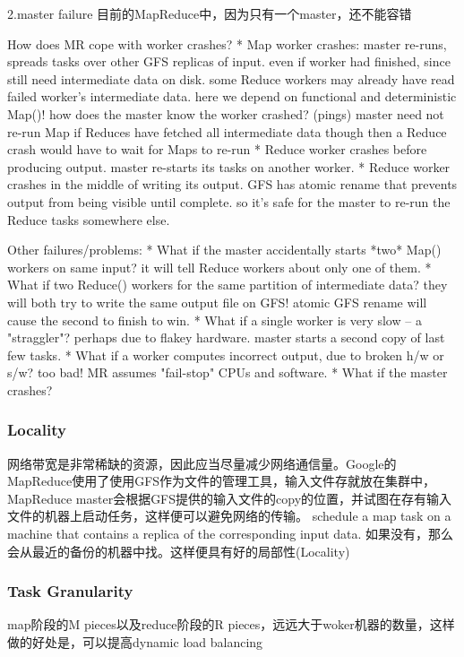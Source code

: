 2.master failure
目前的MapReduce中，因为只有一个master，还不能容错

How does MR cope with worker crashes?
  * Map worker crashes:
    master re-runs, spreads tasks over other GFS replicas of input.
      even if worker had finished, since still need intermediate data on disk.
    some Reduce workers may already have read failed worker's intermediate data.
      here we depend on functional and deterministic Map()!
    how does the master know the worker crashed? (pings)
    master need not re-run Map if Reduces have fetched all intermediate data
      though then a Reduce crash would have to wait for Maps to re-run
  * Reduce worker crashes before producing output.
    master re-starts its tasks on another worker.
  * Reduce worker crashes in the middle of writing its output.
    GFS has atomic rename that prevents output from being visible until complete.
    so it's safe for the master to re-run the Reduce tasks somewhere else.

Other failures/problems:
  * What if the master accidentally starts *two* Map() workers on same input?
    it will tell Reduce workers about only one of them.
  * What if two Reduce() workers for the same partition of intermediate data?
    they will both try to write the same output file on GFS!
    atomic GFS rename will cause the second to finish to win.
  * What if a single worker is very slow -- a "straggler"?
    perhaps due to flakey hardware.
    master starts a second copy of last few tasks.
  * What if a worker computes incorrect output, due to broken h/w or s/w?
    too bad! MR assumes "fail-stop" CPUs and software.
  * What if the master crashes?

\subsubsection{Locality}
网络带宽是非常稀缺的资源，因此应当尽量减少网络通信量。Google的MapReduce使用了使用GFS作为文件的管理工具，输入文件存就放在集群中，MapReduce master会根据GFS提供的输入文件的copy的位置，并试图在存有输入文件的机器上启动任务，这样便可以避免网络的传输。
schedule a map task on a machine that contains a replica of the corresponding input data.
如果没有，那么会从最近的备份的机器中找。这样便具有好的局部性(Locality)

\subsubsection{Task Granularity}
map阶段的M pieces以及reduce阶段的R pieces，远远大于woker机器的数量，这样做的好处是，可以提高dynamic load balancing


